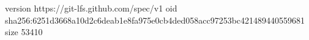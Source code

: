 version https://git-lfs.github.com/spec/v1
oid sha256:6251d3668a10d2c6deab1e8fa975e0cb4ded058acc97253bc421489440559681
size 53410
